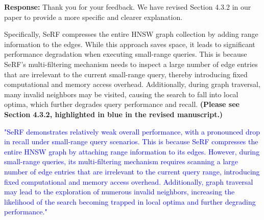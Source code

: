 \documentclass[sigconf, nonacm]{acmart}
\begin{document}
\noindent
\textbf{Response:} Thank you for your feedback. We have revised Section 4.3.2 in our paper to provide a more specific and clearer explanation.

Specifically, SeRF compresses the entire HNSW graph collection by adding range information to the edges. While this approach saves space, it leads to significant performance degradation when executing small-range queries. This is because SeRF’s multi-filtering mechanism needs to inspect a large number of edge entries that are irrelevant to the current small-range query, thereby introducing fixed computational and memory access overhead. Additionally, during graph traversal, many invalid neighbors may be visited, causing the search to fall into local optima, which further degrades query performance and recall. \textbf{(Please see  Section 4.3.2, highlighted in blue in the revised manuscript.)}


\textcolor{blue}{"SeRF demonstrates relatively weak overall performance, with a pronounced drop in recall under small-range query scenarios. This is because SeRF compresses the entire HNSW graph by attaching range information to its edges. However, during small-range queries, its multi-filtering mechanism requires scanning a large number of edge entries that are irrelevant to the current query range, introducing fixed computational and memory access overhead. Additionally, graph traversal may lead to the exploration of numerous invalid neighbors, increasing the likelihood of the search becoming trapped in local optima and further degrading performance."}



\balance
%
%
\end{document}
